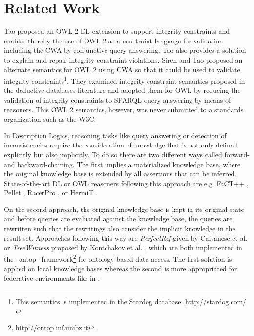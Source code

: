 \documentclass{acm_proc_article-sp}
\begin{document}
\section{Related Work}
\label{sec:related-Work}

Tao \cite{tao2012integrity} proposed an OWL 2 DL extension to support integrity constraints and enables thereby the use of OWL 2 as a constraint language for validation including the CWA by conjunctive query answering. Tao also provides a solution to explain and repair integrity constraint violations.
Siren and Tao proposed an alternate semantics for OWL 2 using CWA so that it could be used to validate integrity constraints\footnote{This semantics is implemented in the Stardog database: \url{http://stardog.com/}}\cite{SirinTao2009}. 
They examined integrity constraint semantics proposed in the deductive databases literature and adopted them for OWL
by reducing the validation of integrity constraints to SPARQL query answering by means of reasoners.
This OWL 2 semantics, however, was never submitted to a standards organization such as the W3C.


In Description Logics, reasoning tasks like query answering or detection of inconsistencies require the consideration of knowledge that is not only defined explicitly but also implicitly. To do so there are two different ways called forward- and backward-chaining. The first implies a materialized knowledge base, where the original knowledge base is extended by all assertions that can be inferred. State-of-the-art DL or OWL reasoners following this approach are e.g. FaCT++ \cite{tsarkov2006fact++}, Pellet \cite{sirin2007pellet},  RacerPro \cite{haarslev2001racer}, or HermiT \cite{horrocks2012hermit}. 

On the second approach, the original knowledge base is kept in its original state and before queries are evaluated against the knowledge base, the queries are rewritten such that the rewritings also consider the implicit knowledge in the result set. 
Approaches following this way are \emph{PerfectRef} given by Calvanese et al. \cite{Calvanese2007} or \emph{TreeWitness} proposed by Kontchakov et al. \cite{kontchakov2011combined}, which are both implemented in the --ontop-- framework\footnote{\url{http://ontop.inf.unibz.it}} for ontology-based data access. 
The first solution is applied on local knowledge bases whereas the second is more appropriated for federative environments like in \cite{nolle2014efficient,nolle2013elite}. 
\end{document}

